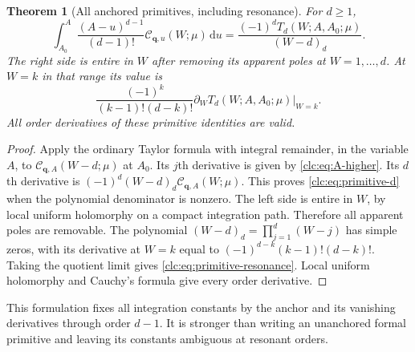 \documentclass[11pt,a4paper]{article}
\numberwithin{equation}{section}
\newtheorem{theorem}{Theorem}[section]
\theoremstyle{definition}\newtheorem{definition}[theorem]{Definition}
\theoremstyle{remark}\newtheorem{remark}[theorem]{Remark}
\newcommand{\dd}{\,\mathrm d}
\newcommand{\bq}{\boldsymbol q}\newcommand{\bs}{\boldsymbol s}
\newcommand{\CC}{\mathcal C}\newcommand{\UU}{\mathcal U}\newcommand{\EE}{\mathcal E}
\begin{document}
\begin{theorem}[All anchored primitives, including resonance]
\label{clc:thm:primitives}
For $d\ge1$,
\begin{equation}\label{clc:eq:primitive-d}
 \boxed{\displaystyle
 \int_{A_0}^A\frac{(A-u)^{d-1}}{(d-1)!}
                 \CC_{\bq,u}(W;\mu)\dd u
 =\frac{(-1)^dT_d(W;A,A_0;\mu)}{(W-d)_d}.}
\end{equation}
The right side is entire in $W$ after removing its apparent poles at
$W=1,\ldots,d$. At $W=k$ in that range its value is
\begin{equation}\label{clc:eq:primitive-resonance}
 \frac{(-1)^k}{(k-1)!(d-k)!}
            \left.\partial_WT_d(W;A,A_0;\mu)\right|_{W=k}.
\end{equation}
All order derivatives of these primitive identities are valid.
\end{theorem}
\begin{proof}
Apply the ordinary Taylor formula with integral remainder, in the
variable $A$, to $\CC_{\bq,A}(W-d;\mu)$ at $A_0$. Its $j$th derivative
is given by \eqref{clc:eq:A-higher}. Its $d$th derivative is
$(-1)^d(W-d)_d\CC_{\bq,A}(W;\mu)$. This proves
\eqref{clc:eq:primitive-d} when the polynomial denominator is nonzero.
The left side is entire in $W$, by local uniform holomorphy on a compact
integration path. Therefore all apparent poles are removable.
The polynomial $(W-d)_d=\prod_{j=1}^d(W-j)$ has simple zeros, with
its derivative at $W=k$ equal to
$(-1)^{d-k}(k-1)!(d-k)!$.
Taking the quotient limit gives \eqref{clc:eq:primitive-resonance}.
Local uniform holomorphy and Cauchy's formula give every order derivative.
\end{proof}

This formulation fixes all integration constants by the anchor and
its vanishing derivatives through order $d-1$. It is stronger than
writing an unanchored formal primitive and leaving its constants
ambiguous at resonant orders.
\end{document}
